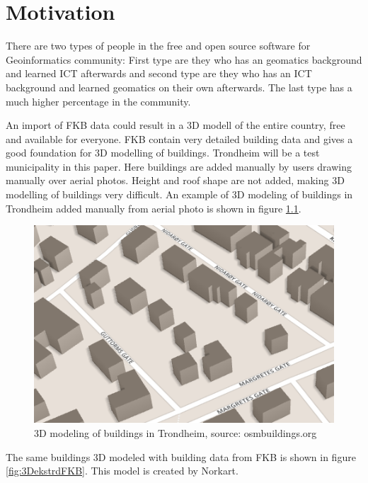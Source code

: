 \documentclass[12pt, a4paper]{report}   	%
\begin{document}
\chapter{Motivation}
There are two types of people in the free and open source software for Geoinformatics community: First type are they who has an geomatics background and learned ICT afterwards and second type are they who has an ICT background and learned geomatics on their own afterwards. The last type has a much higher percentage in the community. 

An import of FKB data could result in a 3D modell of the entire country, free and available for everyone. FKB contain very detailed building data and gives a good foundation for 3D modelling of buildings. Trondheim will be a test municipality in this paper. Here buildings are added manually by users drawing manually over aerial photos. Height and roof shape are not added, making 3D modelling of buildings very difficult. An example of 3D modeling of buildings in Trondheim added manually from aerial photo is shown in figure \ref{fig:3Dekstrd}.

\begin{figure}[H]
    \centering
    \includegraphics[scale=0.4]{figures/FixedByMe/3DmodellTRD.png}
    \caption{3D modeling of buildings in Trondheim, source: osmbuildings.org}
    \label{fig:3Dekstrd}
\end{figure}  

The same buildings 3D modeled with building data from FKB is shown in figure \ref{fig:3DekstrdFKB}. This model is created by Norkart. 
\end{document}
